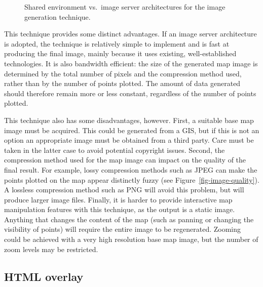 \documentclass[acmtocl,acmnow]{acmtrans2m}
\begin{document}
\begin{figure}
	\caption{Shared environment vs.\ image server architectures for the
	image generation technique.}
	\label{fig-image-architecture}
\end{figure}


This technique provides some distinct advantages. If an image server
architecture is adopted, the technique is relatively simple to implement
and is fast at producing the final image, mainly because it uses
existing, well-established technologies. It is also bandwidth efficient:
the size of the generated map image is determined by the total number of
pixels and the compression method used, rather than by the number of
points plotted. The amount of data generated should therefore remain
more or less constant, regardless of the number of points plotted.

This technique also has some disadvantages, however. First, a suitable
base map image must be acquired. This could be generated from a GIS, but
if this is not an option an appropriate image must be obtained from a
third party. Care must be taken in the latter case to avoid potential
copyright issues. Second, the compression method used for the map image
can impact on the quality of the final result. For example, lossy
compression methods such as JPEG can make the points plotted on the map
appear distinctly fuzzy (see Figure~\ref{fig-image-quality}). A
lossless compression method such as PNG will avoid this problem, but
will produce larger image files. Finally, it is harder to provide
interactive map manipulation features with this technique, as the output
is a static image. Anything that changes the content of the map (such as
panning or changing the visibility of points) will require the entire
image to be regenerated. Zooming could be achieved with a very high
resolution base map image, but the number of zoom levels may be
restricted.


\subsection{HTML overlay}
\label{sec-overlay}

\end{document}
